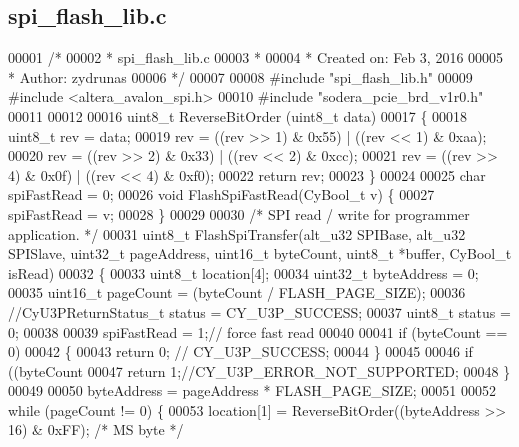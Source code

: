 \subsection{spi\+\_\+flash\+\_\+lib.\+c}
\label{spi__flash__lib_8c_source}

\begin{DoxyCode}
00001 \textcolor{comment}{/*}
00002 \textcolor{comment}{ * spi\_flash\_lib.c}
00003 \textcolor{comment}{ *}
00004 \textcolor{comment}{ *  Created on: Feb 3, 2016}
00005 \textcolor{comment}{ *      Author: zydrunas}
00006 \textcolor{comment}{ */}
00007 
00008 \textcolor{preprocessor}{#include "spi_flash_lib.h"}
00009 \textcolor{preprocessor}{#include <altera_avalon_spi.h>}
00010 \textcolor{preprocessor}{#include "sodera_pcie_brd_v1r0.h"}
00011 
00012 
00016 uint8\_t ReverseBitOrder (uint8\_t data)
00017 \{
00018     uint8\_t rev = data;
00019     rev = ((rev >> 1) & 0x55) | ((rev << 1) & 0xaa);
00020     rev = ((rev >> 2) & 0x33) | ((rev << 2) & 0xcc);
00021     rev = ((rev >> 4) & 0x0f) | ((rev << 4) & 0xf0);
00022     \textcolor{keywordflow}{return} rev;
00023 \}
00024 
00025 \textcolor{keywordtype}{char} spiFastRead = 0;
00026 \textcolor{keywordtype}{void} FlashSpiFastRead(CyBool_t v) \{
00027     spiFastRead = v;
00028 \}
00029 
00030 \textcolor{comment}{/* SPI read / write for programmer application. */}
00031 uint8\_t FlashSpiTransfer(alt_u32 SPIBase, alt_u32 SPISlave, uint32\_t pageAddress, uint16\_t byteCount, 
      uint8\_t *buffer, CyBool_t isRead)
00032 \{
00033     uint8\_t location[4];
00034     uint32\_t byteAddress = 0;
00035     uint16\_t pageCount = (byteCount / FLASH_PAGE_SIZE);
00036     \textcolor{comment}{//CyU3PReturnStatus\_t status = CY\_U3P\_SUCCESS;}
00037     uint8\_t status = 0;
00038 
00039     spiFastRead = 1;\textcolor{comment}{// force fast read}
00040 
00041     \textcolor{keywordflow}{if} (byteCount == 0)
00042     \{
00043         \textcolor{keywordflow}{return} 0; \textcolor{comment}{// CY\_U3P\_SUCCESS;}
00044     \}
00045 
00046     \textcolor{keywordflow}{if} ((byteCount %
00047         \textcolor{keywordflow}{return} 1;\textcolor{comment}{//CY\_U3P\_ERROR\_NOT\_SUPPORTED;}
00048     \}
00049 
00050     byteAddress = pageAddress * FLASH_PAGE_SIZE;
00051 
00052     \textcolor{keywordflow}{while} (pageCount != 0) \{
00053         location[1] = ReverseBitOrder((byteAddress >> 16) & 0xFF);       \textcolor{comment}{/* MS byte */}

\end{DoxyCode}
